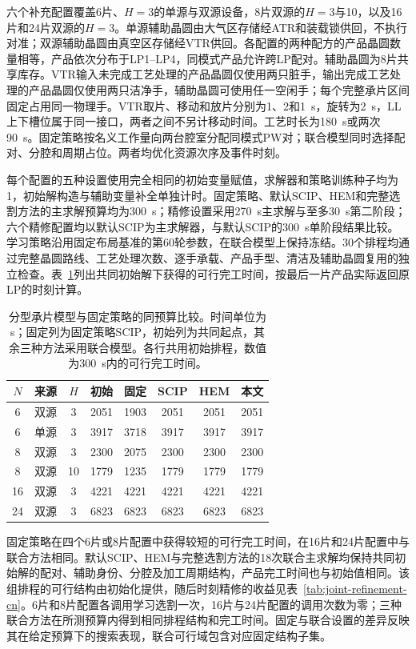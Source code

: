 \documentclass[final,5p,times,twocolumn]{elsarticle}
\begin{document}
六个补充配置覆盖6片、$H=3$的单源与双源设备，8片双源的$H=3$与10，以及16片和24片双源的$H=3$。单源辅助晶圆由大气区存储经ATR和装载锁供回，不执行对准；双源辅助晶圆由真空区存储经VTR供回。各配置的两种配方的产品晶圆数量相等，产品依次分布于LP1--LP4，同模式产品允许跨LP配对。辅助晶圆为8片共享库存。VTR输入未完成工艺处理的产品晶圆仅使用两只脏手，输出完成工艺处理的产品晶圆仅使用两只洁净手，辅助晶圆可使用任一空闲手；每个完整承片区间固定占用同一物理手。VTR取片、移动和放片分别为1、2和1~s，旋转为2~s，LL上下槽位属于同一接口，两者之间不另计移动时间。工艺时长为180~s或两次90~s。固定策略按名义工作量向两台腔室分配同模式PW对；联合模型同时选择配对、分腔和周期占位。两者均优化资源次序及事件时刻。

每个配置的五种设置使用完全相同的初始变量赋值，求解器和策略训练种子均为1，初始解构造与辅助变量补全单独计时。固定策略、默认SCIP、HEM和完整选割方法的主求解预算均为300~s；精修设置采用270~s主求解与至多30~s第二阶段；六个精修配置均以默认SCIP为主求解器，与默认SCIP的300~s单阶段结果比较。学习策略沿用固定布局基准的第60轮参数，在联合模型上保持冻结。30个排程均通过完整晶圆路线、工艺处理次数、逐手承载、产品手型、清洁及辅助晶圆复用的独立检查。表~\ref{tab:joint-search-cn}列出共同初始解下获得的可行完工时间，按最后一片产品实际返回原LP的时刻计算。

\begin{table}[!t]
\centering\scriptsize\setlength{\tabcolsep}{2pt}
\caption{分型承片模型与固定策略的同预算比较。时间单位为s；固定列为固定策略SCIP，初始列为共同起点，其余三种方法采用联合模型。各行共用初始排程，数值为300~s内的可行完工时间。}
\label{tab:joint-search-cn}
\begin{tabular}{cccccccc}\toprule
$N$ & 来源 & $H$ & 初始 & 固定 & SCIP & HEM & 本文\\\midrule
6 & 双源 & 3 & 2051 & 1903 & 2051 & 2051 & 2051\\
6 & 单源 & 3 & 3917 & 3718 & 3917 & 3917 & 3917\\
8 & 双源 & 3 & 2300 & 2075 & 2300 & 2300 & 2300\\
8 & 双源 & 10 & 1779 & 1235 & 1779 & 1779 & 1779\\
16 & 双源 & 3 & 4221 & 4221 & 4221 & 4221 & 4221\\
24 & 双源 & 3 & 6823 & 6823 & 6823 & 6823 & 6823\\
\bottomrule\end{tabular}\end{table}

固定策略在四个6片或8片配置中获得较短的可行完工时间，在16片和24片配置中与联合方法相同。默认SCIP、HEM与完整选割方法的18次联合主求解均保持共同初始解的配对、辅助身份、分腔及加工周期结构，产品完工时间也与初始值相同。该组排程的可行结构由初始化提供，随后时刻精修的收益见表~\ref{tab:joint-refinement-cn}。6片和8片配置各调用学习选割一次，16片与24片配置的调用次数为零；三种联合方法在所测预算内得到相同排程结构和完工时间。固定与联合设置的差异反映其在给定预算下的搜索表现，联合可行域包含对应固定结构子集。
\end{document}

